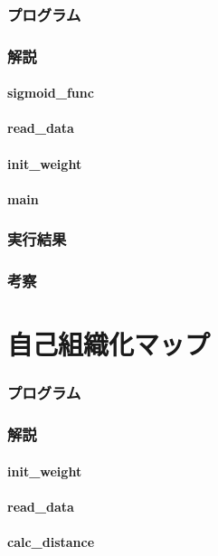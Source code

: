 \documentclass{jsarticle}
\begin{document}
\section{プログラム}


\section{解説}
\subsection{sigmoid\_func}
\subsection{read\_data}
\subsection{init\_weight}
\subsection{main}
\section{実行結果}
\section{考察}

\part{自己組織化マップ}
\section{プログラム}


\section{解説}
\subsection{init\_weight}
\subsection{read\_data}
\subsection{calc\_distance}
\end{document}
